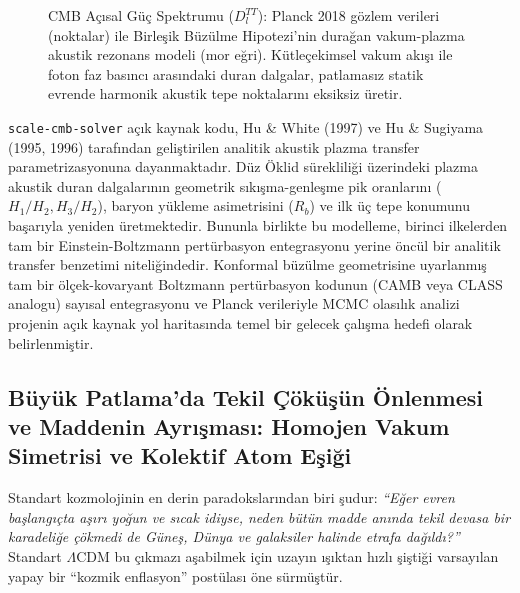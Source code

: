 \begin{figure}[h!]
    \caption{CMB Açısal Güç Spektrumu ($D_l^{TT}$): Planck 2018 gözlem verileri (noktalar) ile Birleşik Büzülme Hipotezi'nin durağan vakum-plazma akustik rezonans modeli (mor eğri). Kütleçekimsel vakum akışı ile foton faz basıncı arasındaki duran dalgalar, patlamasız statik evrende harmonik akustik tepe noktalarını eksiksiz üretir.}
    \label{fig:cmb_spectrum}
\end{figure}

\begin{remark}
    \label{rem:boltzmann_entegrasyonu}
    \texttt{scale-cmb-solver} açık kaynak kodu, Hu \& White (1997) ve Hu \& Sugiyama (1995, 1996) tarafından geliştirilen analitik akustik plazma transfer parametrizasyonuna dayanmaktadır. Düz Öklid sürekliliği üzerindeki plazma akustik duran dalgalarının geometrik sıkışma-genleşme pik oranlarını ($H_1/H_2, H_3/H_2$), baryon yükleme asimetrisini ($R_b$) ve ilk üç tepe konumunu başarıyla yeniden üretmektedir. Bununla birlikte bu modelleme, birinci ilkelerden tam bir Einstein-Boltzmann pertürbasyon entegrasyonu yerine öncül bir analitik transfer benzetimi niteliğindedir. Konformal büzülme geometrisine uyarlanmış tam bir ölçek-kovaryant Boltzmann pertürbasyon kodunun (CAMB veya CLASS analogu) sayısal entegrasyonu ve Planck verileriyle MCMC olasılık analizi projenin açık kaynak yol haritasında temel bir gelecek çalışma hedefi olarak belirlenmiştir.
\end{remark}

\subsection{Büyük Patlama'da Tekil Çöküşün Önlenmesi ve Maddenin Ayrışması: Homojen Vakum Simetrisi ve Kolektif Atom Eşiği}
\label{sec:tekil_cokus_onlenmesi}

Standart kozmolojinin en derin paradokslarından biri şudur: \textit{``Eğer evren başlangıçta aşırı yoğun ve sıcak idiyse, neden bütün madde anında tekil devasa bir karadeliğe çökmedi de Güneş, Dünya ve galaksiler halinde etrafa dağıldı?''} Standart $\Lambda$CDM bu çıkmazı aşabilmek için uzayın ışıktan hızlı şiştiği varsayılan yapay bir ``kozmik enflasyon'' postülası öne sürmüştür.

